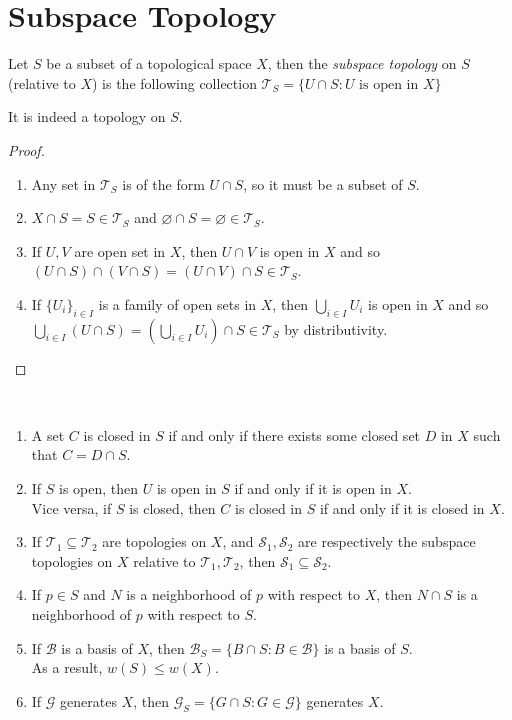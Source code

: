 \documentclass{treatise}
\begin{document}
\section{Subspace Topology}
Let $S$ be a subset of a topological space $X$, then the \emph{subspace topology} on $S$ (relative to $X$) is the following collection $\mathcal{T}_S = \{ U \cap S : U \mbox{ is open in } X \}$
\begin{remark}
It is indeed a topology on $S$.
\end{remark}
\begin{proof} \ 
\begin{enumerate}
    \item Any set in $\mathcal{T}_S$ is of the form $U \cap S$, so it must be a subset of $S$.
    \item $X \cap S = S \in \mathcal{T}_S$ and $\varnothing \cap S = \varnothing \in \mathcal{T}_S$.
    \item If $U, V$ are open set in $X$, then $U \cap V$ is open in $X$ and so $(U \cap S) \cap (V \cap S) = (U \cap V) \cap S \in \mathcal{T}_S$.
    \item If $\{ U_i \}_{i \in I}$ is a family of open sets in $X$, then $\bigcup_{i \in I} U_i$ is open in $X$ and so $\bigcup_{i \in I} (U \cap S) = \left( \bigcup_{i \in I} U_i \right) \cap S \in \mathcal{T}_S$ by distributivity.
\end{enumerate}
\end{proof}
\begin{proposition} \label{sub-topo-prop-1}\ 
\begin{enumerate}
    \item A set $C$ is closed in $S$ if and only if there exists some closed set $D$ in $X$ such that $C = D \cap S$.
    \item If $S$ is open, then $U$ is open in $S$ if and only if it is open in $X$.
    \\
    Vice versa, if $S$ is closed, then $C$ is closed in $S$ if and only if it is closed in $X$.
    \item If $\mathcal{T}_1 \subseteq \mathcal{T}_2$ are topologies on $X$, and $\mathcal{S}_1, \mathcal{S}_2$ are respectively the subspace topologies on $X$ relative to $\mathcal{T}_1, \mathcal{T}_2$, then $\mathcal{S}_1 \subseteq \mathcal{S}_2$.
    \item If $p \in S$ and $N$ is a neighborhood of $p$ with respect to $X$, then $N \cap S$ is a neighborhood of $p$ with respect to $S$.
    \item If $\mathcal{B}$ is a basis of $X$, then $\mathcal{B}_S = \{ B \cap S : B \in \mathcal{B} \}$ is a basis of $S$.
    \\
    As a result, $w(S) \leq w(X)$.
    \item If $\mathcal{G}$ generates $X$, then $\mathcal{G}_S = \{ G \cap S : G \in \mathcal{G} \}$ generates $X$.
\end{enumerate}
\end{proposition}
\end{document}
